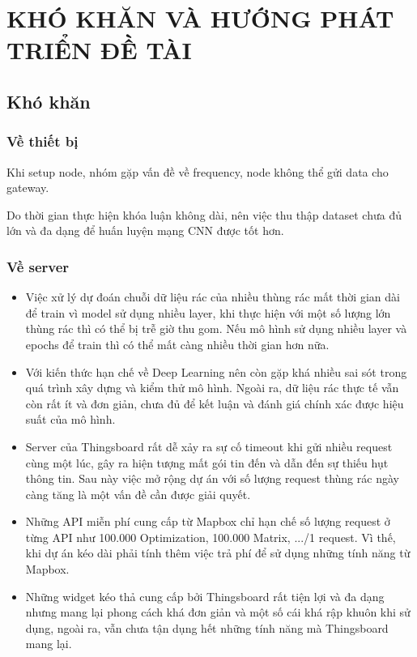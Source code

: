 

\chapter{KHÓ KHĂN VÀ HƯỚNG PHÁT TRIỂN ĐỀ TÀI}


\section{Khó khăn}
\subsection{Về thiết bị}
Khi setup node, nhóm gặp vấn đề về frequency, node không thể gửi data cho gateway.

Do thời gian thực hiện khóa luận không dài, nên việc thu thập dataset chưa đủ lớn và đa dạng để huấn luyện mạng CNN được tốt hơn.

\subsection{Về server}
\begin{itemize}
    \item Việc xử lý dự đoán chuỗi dữ liệu rác của nhiều thùng rác mất thời gian dài để train vì model sử dụng nhiều layer, khi thực hiện với một số lượng lớn thùng rác thì có thể bị trễ giờ thu gom. Nếu mô hình sử dụng nhiều layer và epochs để train thì có thể mất càng nhiều thời gian hơn nữa.
    \item Với kiến thức hạn chế về Deep Learning nên còn gặp khá nhiều sai sót trong quá trình xây dựng và kiểm thử mô hình. Ngoài ra, dữ liệu rác thực tế vẫn còn rất ít và đơn giản, chưa đủ để kết luận và đánh giá chính xác được hiệu suất của mô hình. 
    \item Server của Thingsboard rất dễ xảy ra sự cố timeout khi gửi nhiều request cùng một lúc, gây ra hiện tượng mất gói tin đến và dẫn đến sự thiếu hụt thông tin. Sau này việc mở rộng dự án với số lượng request thùng rác ngày càng tăng là một vấn đề cần được giải quyết.
    \item Những API miễn phí cung cấp từ Mapbox chỉ hạn chế số lượng request ở từng API như 100.000 Optimization, 100.000 Matrix, .../1 request. Vì thế, khi dự án kéo dài phải tính thêm việc trả phí để sử dụng những tính năng từ Mapbox.
    \item Những widget kéo thả cung cấp bởi Thingsboard rất tiện lợi và đa dạng nhưng mang lại phong cách khá đơn giản và một số cái khá rập khuôn khi sử dụng, ngoài ra, vẫn chưa tận dụng hết những tính năng mà Thingsboard mang lại.      
\end{itemize}

